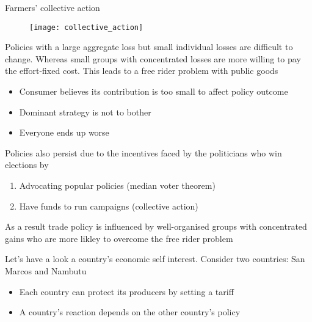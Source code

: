 \documentclass{beamer}
\begin{document}
\begin{frame}{Farmers' collective action}
  \begin{figure}
    \texttt{[image: collective\_action]}
  \end{figure}
\end{frame}

\begin{frame}
  Policies with a large aggregate loss but small individual losses are difficult to change.
  Whereas small groups with concentrated losses are more willing to pay the effort-fixed cost.
  This leads to a free rider problem with public goods
  \begin{itemize}
    \item Consumer believes its contribution is too small to affect policy outcome
    \item Dominant strategy is not to bother
    \item Everyone ends up worse
  \end{itemize}
\end{frame}

\begin{frame}
  Policies also persist due to the incentives faced by the politicians who win elections by
  \begin{enumerate}
    \item Advocating popular policies (median voter theorem)
    \item Have funds to run campaigns (collective action)
  \end{enumerate}
  \medskip
  As a result trade policy is influenced by well-organised groups with concentrated gains who are more likley to overcome the free rider problem 
\end{frame}

\begin{frame}
  Let's have a look a country's economic self interest. 
  Consider two countries: San Marcos and Nambutu
  \begin{itemize}
    \item Each country can protect its producers by setting a tariff
    \item A country's reaction depends on the other country's policy
  \end{itemize}  
\end{frame}
\end{document}
